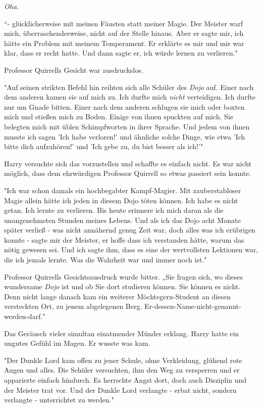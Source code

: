 {\emph{Oha.}

“- glücklicherweise mit meinen Fäusten statt meiner Magie. Der Meister warf mich, überraschenderweise, nicht auf der Stelle hinaus. Aber er sagte mir, ich hätte ein Problem mit meinem Temperament. Er erklärte es mir und mir war klar, dass er recht hatte. Und dann sagte er, ich würde lernen zu verlieren."

Professor Quirrells Gesicht war ausdruckslos.

"Auf seinen strikten Befehl hin reihten sich alle Schüler des \emph{Dojo} auf. Einer nach dem anderen kamen sie auf mich zu. Ich durfte mich \emph{nicht} verteidigen. Ich durfte nur um Gnade bitten. Einer nach dem anderen schlugen sie mich oder boxten mich und stießen mich zu Boden. Einige von ihnen spuckten auf mich. Sie belegten mich mit üblen Schimpfworten in ihrer Sprache. Und jedem von ihnen musste ich sagen 'Ich habe verloren!' und ähnliche solche Dinge, wie etwa 'Ich bitte dich aufzuhören!' und 'Ich gebe zu, du bist besser als ich!'"

Harry versuchte sich das vorzustellen und schaffte es einfach nicht. Es war nicht möglich, dass dem ehrwürdigen Professor Quirrell so etwas passiert sein konnte.

"Ich war schon damals ein hochbegabter Kampf-Magier. Mit zauberstabloser Magie allein hätte ich jeden in diesem Dojo töten können. Ich habe es nicht getan. Ich lernte zu verlieren. Bis heute erinnere ich mich daran als die unangenehmsten Stunden meines Lebens. Und als ich das Dojo acht Monate später verließ - was nicht annähernd genug Zeit war, doch alles was ich erübrigen konnte - sagte mir der Meister, er hoffe dass ich verstanden hätte, warum das nötig gewesen sei. Und ich sagte ihm, dass es eine der wertvollsten Lektionen war, die ich jemals lernte. Was die Wahrheit war und immer noch ist."

Professor Quirrells Gesichtsausdruck wurde bitter. „Sie fragen sich, wo dieses wundersame \emph{Dojo} ist und ob Sie dort studieren können. Sie können es nicht. Denn nicht lange danach kam ein weiterer Möchtegern-Student an diesen versteckten Ort, zu jenem abgelegenen Berg. Er-dessen-Name-nicht-genannt-werden-darf."

Das Geräusch vieler simultan einatmender Münder erklang. Harry hatte ein ungutes Gefühl im Magen. Er wusste was kam.

"Der Dunkle Lord kam offen zu jener Schule, ohne Verkleidung, glühend rote Augen und alles. Die Schüler versuchten, ihm den Weg zu versperren und er apparierte einfach hindurch. Es herrschte Angst dort, doch auch Disziplin und der Meister trat vor. Und der Dunkle Lord verlangte - erbat nicht, sondern verlangte - unterrichtet zu werden."

}
